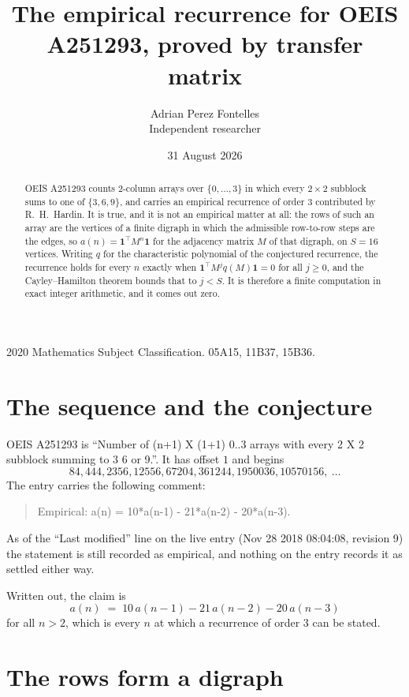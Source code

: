 \documentclass[11pt,a4paper]{article}
\title{The empirical recurrence for OEIS A251293, proved by transfer matrix}
\author{Adrian Perez Fontelles\\ \small Independent researcher}
\date{31 August 2026}
\theoremstyle{plain}
\theoremstyle{definition}
\begin{document}
\maketitle

\begin{abstract}
OEIS A251293 counts $2$-column arrays over $\{0,\dots,3\}$ in which every
$2\times2$ subblock sums to one of $\{3, 6, 9\}$, and carries an empirical
recurrence of order $3$ contributed by R.~H.~Hardin. It is true, and it is not an
empirical matter at all: the rows of such an array are the vertices of a finite digraph in
which the admissible row-to-row steps are the edges, so $a(n)=\mathbf{1}^{\!\top}M^{n}
\mathbf{1}$ for the adjacency matrix $M$ of that digraph, on $S=16$ vertices. Writing
$q$ for the characteristic polynomial of the conjectured recurrence, the recurrence holds
for every $n$ exactly when $\mathbf{1}^{\!\top}M^{j}q(M)\mathbf{1}=0$ for all
$j\ge0$, and the Cayley--Hamilton theorem bounds that to $j<S$. It is therefore a finite
computation in exact integer arithmetic, and it comes out zero.
\end{abstract}

\noindent\small 2020 Mathematics Subject Classification. 05A15, 11B37, 15B36.\normalsize

\section{The sequence and the conjecture}

OEIS A251293 is ``Number of (n+1) X (1+1) 0..3 arrays with every 2 X 2 subblock summing to 3 6 or 9.''. It has offset $1$
and begins
\[
84, 444, 2356, 12556, 67204, 361244, 1950036, 10570156,\ \dots
\]
The entry carries the following comment:
\begin{quote}\small
Empirical: a(n) = 10*a(n-1) - 21*a(n-2) - 20*a(n-3).
\end{quote}
As of the ``Last modified'' line on the live entry (Nov 28 2018 08:04:08, revision 9) the statement is
still recorded as empirical, and nothing on the entry records it as settled either way.

Written out, the claim is
\begin{equation}\label{eq:conj}
a(n)\;=\;10\,a(n-1) - 21\,a(n-2) - 20\,a(n-3)
\end{equation}
for all $n>2$, which is every $n$ at which a recurrence of order $3$ can be
stated.

\section{The rows form a digraph}
\end{document}
